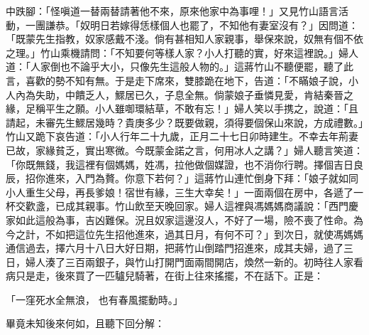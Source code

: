 \begin{showcontents}{}
中跌腳：「怪嗔道一替兩替請著他不來，原來他家中為事哩！」又見竹山語言活動，一團謙恭。「奴明日若嫁得恁樣個人也罷了，不知他有妻室沒有？」因問道：「既蒙先生指教，奴家感戴不淺。倘有甚相知人家親事，舉保來說，奴無有個不依之理。」竹山乘機請問：「不知要何等樣人家？小人打聽的實，好來這裡說。」婦人道：「人家倒也不論乎大小，只像先生這般人物的。」這蔣竹山不聽便罷，聽了此言，喜歡的勢不知有無。于是走下席來，雙膝跪在地下，告道：「不瞞娘子說，小人內為失助，中饋乏人，鰥居已久，子息全無。倘蒙娘子垂憐見愛，肯結秦晉之緣，足稱平生之願。小人雖啣環結草，不敢有忘！」婦人笑以手携之，說道：「且請起，未審先生鰥居幾時？貴庚多少？既要做親，須得要個保山來說，方成禮數。」竹山又跪下哀告道：「小人行年二十九歲，正月二十七日卯時建生。不幸去年荊妻已故，家緣貧乏，實出寒微。今既蒙金諾之言，何用冰人之講？」婦人聽言笑道：「你既無錢，我這裡有個媽媽，姓馮，拉他做個媒證，也不消你行聘。擇個吉日良辰，招你進來，入門為贅。你意下若何？」這蔣竹山連忙倒身下拜：「娘子就如同小人重生父母，再長爹娘！宿世有緣，三生大幸矣！」一面兩個在房中，各遞了一杯交歡盞，已成其親事。竹山飲至天晚回家。婦人這裡與馮媽媽商議說：「西門慶家如此這般為事，吉凶難保。況且奴家這邊沒人，不好了一場，險不喪了性命。為今之計，不如把這位先生招他進來，過其日月，有何不可？」到次日，就使馮媽媽通信過去，擇六月十八日大好日期，把蔣竹山倒踏門招進來，成其夫婦，過了三日，婦人湊了三百兩銀子，與竹山打開門面兩間開店，煥然一新的。初時往人家看病只是走，後來買了一匹驢兒騎著，在街上往來搖擺，不在話下。正是：

「一窪死水全無浪，  也有春風擺動時。」

畢竟未知後來何如，且聽下回分解：





\end{showcontents}
